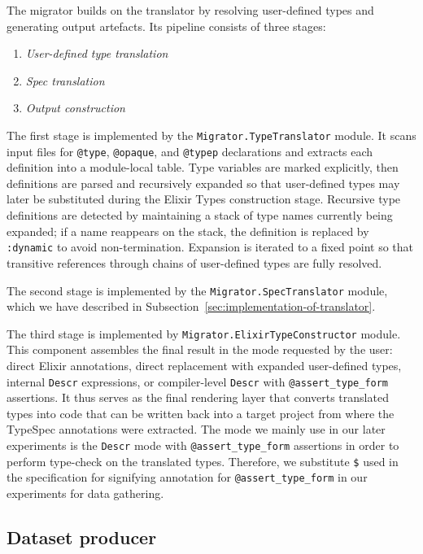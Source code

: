 The migrator builds on the translator by resolving user-defined types and generating output artefacts.
Its pipeline consists of three stages:
\begin{enumerate}
    \item \textit{User-defined type translation}
    \item \textit{Spec translation}
    \item \textit{Output construction}
\end{enumerate}

The first stage is implemented by the \texttt{Migrator.TypeTranslator} module.
It scans input files for \texttt{@type}, \texttt{@opaque}, and \texttt{@typep} declarations and extracts each definition into a module-local table.
Type variables are marked explicitly, then definitions are parsed and recursively expanded so that user-defined types may later be substituted during the Elixir Types construction stage.
Recursive type definitions are detected by maintaining a stack of type names currently being expanded; if a name reappears on the stack, the definition is replaced by \texttt{:dynamic} to avoid non-termination.
Expansion is iterated to a fixed point so that transitive references through chains of user-defined types are fully resolved.

The second stage is implemented by the \texttt{Migrator.SpecTranslator} module, which we have described in Subsection~\ref{sec:implementation-of-translator}.

The third stage is implemented by \texttt{Migrator.ElixirTypeConstructor} module.
This component assembles the final result in the mode requested by the user: direct Elixir annotations, direct replacement with expanded user-defined types, internal \texttt{Descr} expressions, or compiler-level \texttt{Descr} with \texttt{@assert\_type\_form} assertions.
It thus serves as the final rendering layer that converts translated types into code that can be written back into a target project from where the TypeSpec annotations were extracted.
The mode we mainly use in our later experiments is the \texttt{Descr} mode with \texttt{@assert\_type\_form} assertions in order to perform type-check on the translated types.
Therefore, we substitute \texttt{\$} used in the specification for signifying annotation for \texttt{@assert\_type\_form} in our experiments for data gathering.

\subsection{Dataset producer}

